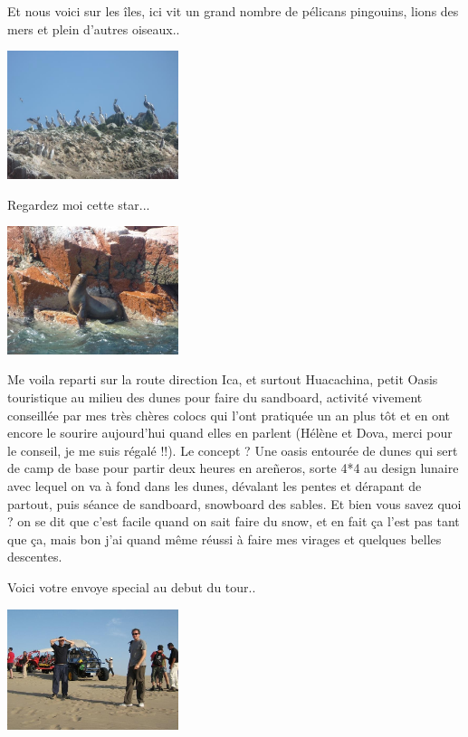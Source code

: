 \begin{multicols}{2}
Et nous voici sur les îles, ici vit un grand nombre de pélicans pingouins, lions des mers et plein d'autres oiseaux..

\smallbreak
\hspace*{-0.65cm}
\includegraphics[width=5cm]{articles/Cote-du-sud/1255997482Hoy0.jpg}
\smallbreak

Regardez moi cette star...

\smallbreak
\hspace*{-0.65cm}
\includegraphics[width=5cm]{articles/Cote-du-sud/1255997520UtdU.jpg}
\smallbreak

Me voila reparti sur la route direction Ica, et surtout Huacachina, petit Oasis touristique au milieu des dunes pour faire du sandboard, activité vivement conseillée par mes très chères colocs qui l'ont pratiquée un an plus tôt et en ont encore le sourire aujourd'hui quand elles en parlent (Hélène et Dova, merci pour le conseil, je me suis régalé !!). Le concept ? Une oasis entourée de dunes qui sert de camp de base pour partir deux heures en areñeros, sorte 4*4 au design lunaire avec lequel on va à fond dans les dunes, dévalant les pentes et dérapant de partout, puis séance de sandboard, snowboard des sables. Et bien vous savez quoi ? on se dit que c'est facile quand on sait faire du snow, et en fait ça l'est pas tant que ça, mais bon j'ai quand même réussi à faire mes virages et quelques belles descentes.

Voici votre envoye special au debut du tour..

\smallbreak
\hspace*{-0.65cm}
\includegraphics[width=5cm]{articles/Cote-du-sud/1255997503PLr1.jpg}
\smallbreak


\end{multicols}
